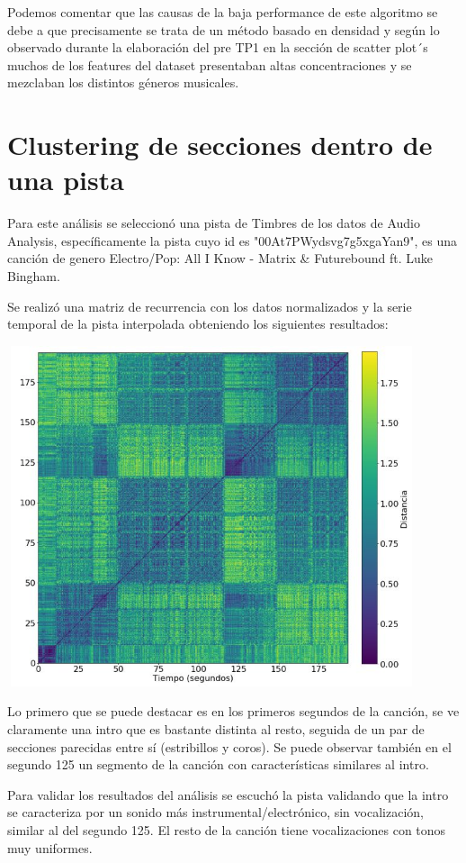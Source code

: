 \documentclass{icisfinal}
\begin{document}
Podemos comentar que las causas de la baja performance de este algoritmo se debe a que precisamente se trata de un método basado en densidad y según lo observado durante la elaboración del pre TP1 en la sección de scatter plot´s muchos de los features del dataset presentaban altas concentraciones y se mezclaban los distintos géneros musicales.

\newpage
\section{Clustering de secciones dentro de una pista}
Para este análisis se seleccionó una pista de Timbres de los datos de Audio Analysis, específicamente la pista cuyo id es "00At7PWydsvg7g5xgaYan9", es una canción de genero Electro/Pop: All I Know - Matrix \& Futurebound ft. Luke Bingham.

Se realizó una matriz de recurrencia con los datos normalizados y la serie temporal de la pista interpolada obteniendo los siguientes resultados:

\includegraphics[width=12cm, height=10cm]{img/imagenes/10_matriz_recurrencia}

Lo primero que se puede destacar es en los primeros segundos de la canción, se ve claramente una intro que es bastante distinta al resto, seguida de un par de secciones parecidas entre sí (estribillos y coros). Se puede observar también en el segundo 125 un segmento de la canción con características similares al intro.

Para validar los resultados del análisis se escuchó la pista validando que la intro se caracteriza por un sonido más instrumental/electrónico, sin vocalización, similar al del segundo 125. El resto de la canción tiene vocalizaciones con tonos muy uniformes. 
\end{document}
